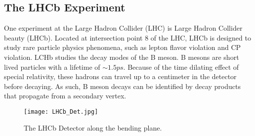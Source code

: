   \subsection{The LHCb Experiment}

    One experiment at the Large Hadron Collider (LHC) is Large Hadron Collider beauty (LHCb).
    Located at intersection point 8 of the LHC, LHCb is designed to study rare particle physics phenomena, such as lepton flavor violation and CP violation. 
    LCHb studies the decay modes of the B meson.
    B mesons are short lived particles with a lifetime of $\sim 1.5ps$.
    Because of the time dilating effect of special relativity, these hadrons can travel up to a centimeter in the detector before decaying. 
    As such, B meson decays can be identified by decay products that propagate from a secondary vertex.

    \begin{figure}[h!]
      \centering
      \texttt{[image: LHCb\_Det.jpg]}
      \caption{The LHCb Detector along the bending plane.}
      \label{fig:LHCb_Collab}
    \end{figure}

